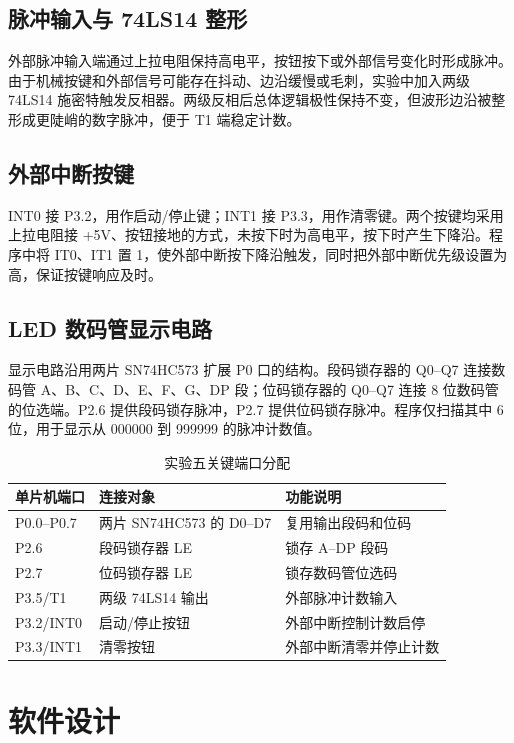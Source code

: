 \subsection{脉冲输入与 74LS14 整形}
外部脉冲输入端通过上拉电阻保持高电平，按钮按下或外部信号变化时形成脉冲。由于机械按键和外部信号可能存在抖动、边沿缓慢或毛刺，实验中加入两级 74LS14 施密特触发反相器。两级反相后总体逻辑极性保持不变，但波形边沿被整形成更陡峭的数字脉冲，便于 T1 端稳定计数。

\subsection{外部中断按键}
INT0 接 P3.2，用作启动/停止键；INT1 接 P3.3，用作清零键。两个按键均采用上拉电阻接 +5V、按钮接地的方式，未按下时为高电平，按下时产生下降沿。程序中将 IT0、IT1 置 1，使外部中断按下降沿触发，同时把外部中断优先级设置为高，保证按键响应及时。

\subsection{LED 数码管显示电路}
显示电路沿用两片 SN74HC573 扩展 P0 口的结构。段码锁存器的 Q0--Q7 连接数码管 A、B、C、D、E、F、G、DP 段；位码锁存器的 Q0--Q7 连接 8 位数码管的位选端。P2.6 提供段码锁存脉冲，P2.7 提供位码锁存脉冲。程序仅扫描其中 6 位，用于显示从 000000 到 999999 的脉冲计数值。

\begin{table}[H]
  \centering
  \caption{实验五关键端口分配}
  \begin{tabular}{>{\centering\arraybackslash}p{3cm}p{5.2cm}p{5.8cm}}
    \toprule
    单片机端口 & 连接对象 & 功能说明 \\
    \midrule
    P0.0--P0.7 & 两片 SN74HC573 的 D0--D7 & 复用输出段码和位码 \\
    P2.6 & 段码锁存器 LE & 锁存 A--DP 段码 \\
    P2.7 & 位码锁存器 LE & 锁存数码管位选码 \\
    P3.5/T1 & 两级 74LS14 输出 & 外部脉冲计数输入 \\
    P3.2/INT0 & 启动/停止按钮 & 外部中断控制计数启停 \\
    P3.3/INT1 & 清零按钮 & 外部中断清零并停止计数 \\
    \bottomrule
  \end{tabular}
\end{table}

\section{软件设计}

